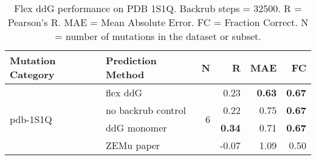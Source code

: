 \begin{table}
  \begin{tabular}{llrrrr}
\toprule
Mutation Category &   Prediction Method &  N &     R &  MAE &   FC \\
\midrule
 \multirow{ 4}{*}{pdb-1S1Q} & flex ddG & \multirow{ 4}{*}{6} & 0.23 & \textbf{0.63} & \textbf{0.67}  \\
 & no backrub control & & 0.22 & 0.75 & \textbf{0.67}  \\
 & ddG monomer & & \textbf{0.34} & 0.71 & \textbf{0.67}  \\
 & ZEMu paper & & -0.07 & 1.09 & 0.50  \\
\bottomrule
\end{tabular}
  \caption[Flex ddG performance on PDB 1S1Q]{
    Flex ddG performance on PDB 1S1Q. Backrub steps = 32500. R = Pearson's R. MAE = Mean Absolute Error. FC = Fraction Correct. N = number of mutations in the dataset or subset.
  } \label{tab:table-pdb-1S1Q}
\end{table}
